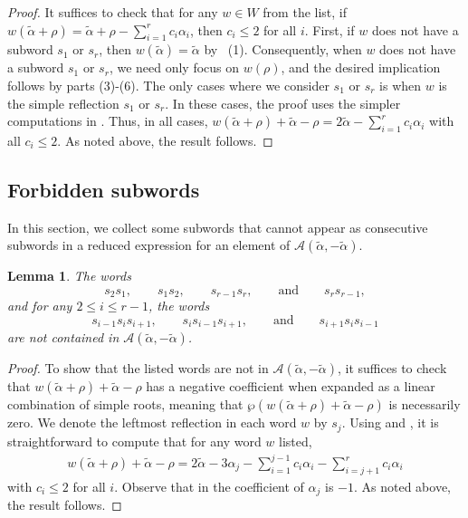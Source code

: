 \documentclass{amsart}
\newtheorem{lemma}[theorem]{Lemma}
\theoremstyle{definition}
\newcommand{\hroot}{\tilde{\alpha}}
\newcommand{\calA}{\mathcal{A}}
\begin{document}
\begin{proof}
It suffices to check that for any $w \in W$ from the list, if $w(\tilde{\alpha} + \rho) = \tilde{\alpha} + \rho - \sum_{i=1}^r c_i \alpha_i$, then $c_i \leq 2$ for all $i$. 
First, if $w$ does not have a subword $s_1$ or $s_r$, then $w(\tilde{\alpha}) = \tilde{\alpha}$ by ~(1). 
Consequently, when $w$ does not have a subword $s_1$ or $s_r$, we need only focus on $w(\rho)$, and the desired implication follows by  parts (3)-(6). The only cases where we consider $s_1$ or $s_r$ is when $w$ is the simple reflection $s_1$ or $s_r$.
In these cases, the proof uses the simpler computations in .
Thus, in all cases, $w(\tilde{\alpha}+\rho)+\tilde{\alpha}-\rho=2\tilde{\alpha}-\sum_{i=1}^r c_i \alpha_i$ with all $c_i\leq 2$. As noted above, the result follows.
\end{proof}

\subsection{Forbidden subwords} 


In this section, we collect some subwords that cannot appear as consecutive subwords in a reduced expression for an element of $\calA(\tilde\alpha,-\tilde\alpha)$.


\begin{lemma}\label{lem:forbidden words}
The words 
\[s_2s_1,\qquad s_1s_2,\qquad s_{r-1}s_r, \qquad \text{and} \qquad s_rs_{r-1},\] and for any $2 \le i \le r-1$, the words
\[s_{i-1}s_is_{i+1}, \qquad s_{i}s_{i-1}s_{i+1}, \qquad \text{and} \qquad s_{i+1}s_is_{i-1}\]
are not contained in $\calA(\hroot,-\hroot)$.
\end{lemma}

\begin{proof}

To show that the listed words are not in $\calA(\hroot,-\hroot)$, it suffices to check that $w(\tilde{\alpha}+\rho)+\tilde{\alpha}-\rho$ has a negative coefficient when expanded as a linear combination of simple roots, meaning that $\wp(w(\tilde{\alpha}+\rho)+\tilde{\alpha}-\rho)$ is necessarily zero. We denote the leftmost reflection in each word $w$ by $s_j$. Using  and , it is straightforward to compute that for any word $w$ listed, 
\begin{align}
w(\tilde{\alpha}+\rho)+\tilde{\alpha}-\rho=2\tilde{\alpha}-3\alpha_j-\sum_{i=1}^{j-1} c_i \alpha_i-\sum_{i=j+1}^{r} c_i\label{eq:comp} \alpha_i\end{align}
with $c_i\leq 2$ for all $i$. 
Observe that in  the coefficient of $\alpha_j$ is $-1$.
As noted above, the result follows. 
\qedhere
\end{proof}
\end{document}
